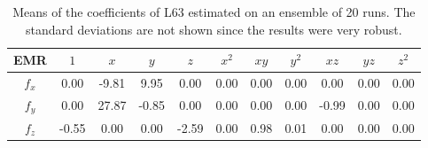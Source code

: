 \documentclass[12pt]{article}
\begin{document}
\begin{table}[H]
	\centering
	\begin{tabular}{c | cccccccccc}
		EMR & $1$ & $x$ & $y$ & $z$ & $x^2$ & $xy$ & $y^2$ & $xz$ & $yz$ & $z^2$  \\ \hline
		$f_x$ & \hphantom{-}0.00 & -9.81 & \hphantom{-}9.95 & \hphantom{-}0.00 & \hphantom{-}0.00 &\hphantom{-}0.00 & \hphantom{-}0.00 & \hphantom{-}0.00 & \hphantom{-}0.00 & \hphantom{-}0.00 \\ 
		$f_y$ & \hphantom{-}0.00 & \hphantom{-}27.87 & -0.85 & \hphantom{-}0.00& \hphantom{-}0.00 & \hphantom{-}0.00 & \hphantom{-}0.00 & -0.99 &\hphantom{-}0.00 & \hphantom{-}0.00\\ 
		$f_z$ & -0.55 & \hphantom{-}0.00 & \hphantom{-}0.00 & -2.59 & \hphantom{-}0.00 & \hphantom{-}0.98 & \hphantom{-}0.01 & \hphantom{-}0.00& \hphantom{-}0.00 & \hphantom{-}0.00 \\ 
	\end{tabular}
	\caption{Means of the coefficients of L63 estimated on an ensemble of 20 runs. The standard deviations are not shown since the results were very robust.}
\end{table}


%
%
%
\end{document}
